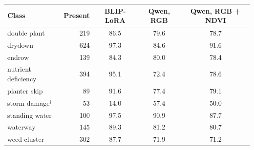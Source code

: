 \begin{tabular}{lrccc}
\toprule
Class & Present & BLIP-LoRA & Qwen, RGB & Qwen, RGB + NDVI \\
\midrule
double plant & 219 & 86.5 & 79.6 & 78.7 \\
drydown & 624 & 97.3 & 84.6 & 91.6 \\
endrow & 139 & 84.3 & 80.0 & 78.4 \\
nutrient deficiency & 394 & 95.1 & 72.4 & 78.6 \\
planter skip & 89 & 91.6 & 77.4 & 79.1 \\
storm damage$^\dagger$ & 53 & 14.0 & 57.4 & 50.0 \\
standing water & 100 & 97.5 & 90.9 & 87.7 \\
waterway & 145 & 89.3 & 81.2 & 80.7 \\
weed cluster & 302 & 87.7 & 71.9 & 71.2 \\
\bottomrule
\end{tabular}

